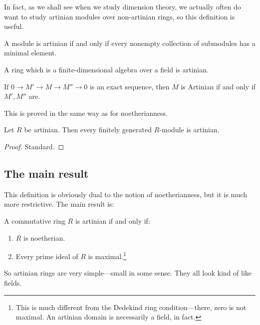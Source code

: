In fact, as we shall see when we study dimension theory, we actually often do
want to study artinian modules over non-artinian rings, so this definition is
useful. 

\begin{exercise} 
A module is artinian if and only if every nonempty collection of submodules
has a minimal element.
\end{exercise} 
\begin{exercise} 
A ring which is a finite-dimensional algebra over a field is artinian.
\end{exercise} 
\begin{proposition}  \label{exactartinian}
If $0 \to M' \to M \to M'' \to 0$ is an exact sequence, then $M$ is Artinian
if and only if $M', M''$ are. 
\end{proposition}

This is proved in the same way as for noetherianness.

\begin{corollary} 
Let $R$ be artinian. Then every finitely generated $R$-module is artinian.
\end{corollary} 
\begin{proof} 
Standard.
\end{proof} 

\subsection{The main result}
This definition is obviously dual to the notion of noetherianness, but it is
much more restrictive.  
The main result is:

\begin{theorem} \label{artinianclassification}
A commutative ring $R$ is artinian if and only if:
\begin{enumerate}
\item $R$ is noetherian. 
\item Every prime ideal of $R$ is maximal.\footnote{This is much different from
the Dedekind ring condition---there, zero is not maximal. An artinian domain is
necessarily a field, in fact.}
\end{enumerate}
\end{theorem} 


So artinian rings are very simple---small in some sense.
They all look kind of like fields.

